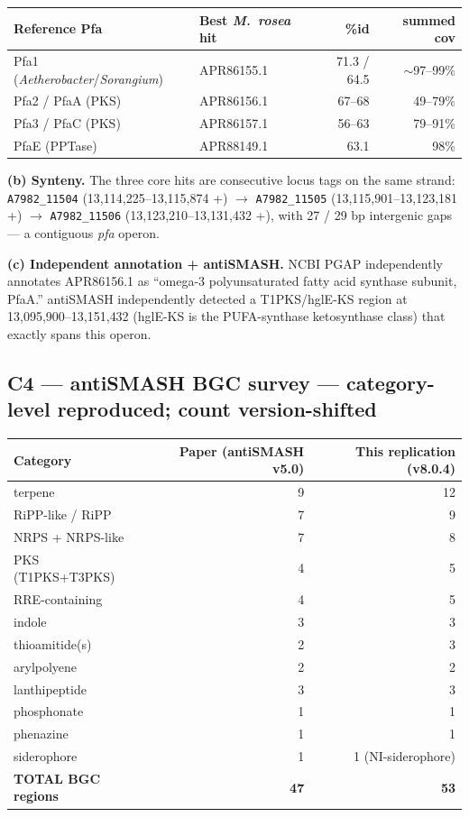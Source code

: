 \documentclass[11pt,a4paper]{article}
\begin{document}
\begin{longtable}{@{}l l r r@{}}
\toprule
Reference Pfa & Best \textit{M.\ rosea} hit & \%id & summed cov \\
\midrule
Pfa1 (\textit{Aetherobacter}/\textit{Sorangium}) & APR86155.1 & 71.3 / 64.5 & $\sim$97--99\% \\
Pfa2 / PfaA (PKS) & APR86156.1 & 67--68 & 49--79\% \\
Pfa3 / PfaC (PKS) & APR86157.1 & 56--63 & 79--91\% \\
PfaE (PPTase) & APR88149.1 & 63.1 & 98\% \\
\bottomrule
\end{longtable}

\textbf{(b) Synteny.} The three core hits are consecutive locus tags on the same strand: \texttt{A7982\_11504} (13{,}114{,}225--13{,}115{,}874 +) $\to$ \texttt{A7982\_11505} (13{,}115{,}901--13{,}123{,}181 +) $\to$ \texttt{A7982\_11506} (13{,}123{,}210--13{,}131{,}432 +), with 27 / 29 bp intergenic gaps --- a contiguous \textit{pfa} operon.

\textbf{(c) Independent annotation + antiSMASH.} NCBI PGAP independently annotates APR86156.1 as ``omega-3 polyunsaturated fatty acid synthase subunit, PfaA.'' antiSMASH independently detected a T1PKS/hglE-KS region at 13{,}095{,}900--13{,}151{,}432 (hglE-KS is the PUFA-synthase ketosynthase class) that exactly spans this operon.

\subsection{C4 --- antiSMASH BGC survey --- category-level reproduced; count version-shifted}

\begin{longtable}{@{}l r r@{}}
\toprule
Category & Paper (antiSMASH v5.0) & This replication (v8.0.4) \\
\midrule
terpene & 9 & 12 \\
RiPP-like / RiPP & 7 & 9 \\
NRPS + NRPS-like & 7 & 8 \\
PKS (T1PKS+T3PKS) & 4 & 5 \\
RRE-containing & 4 & 5 \\
indole & 3 & 3 \\
thioamitide(s) & 2 & 3 \\
arylpolyene & 2 & 2 \\
lanthipeptide & 3 & 3 \\
phosphonate & 1 & 1 \\
phenazine & 1 & 1 \\
siderophore & 1 & 1 (NI-siderophore) \\
\midrule
\textbf{TOTAL BGC regions} & \textbf{47} & \textbf{53} \\
\bottomrule
\end{longtable}
\end{document}
